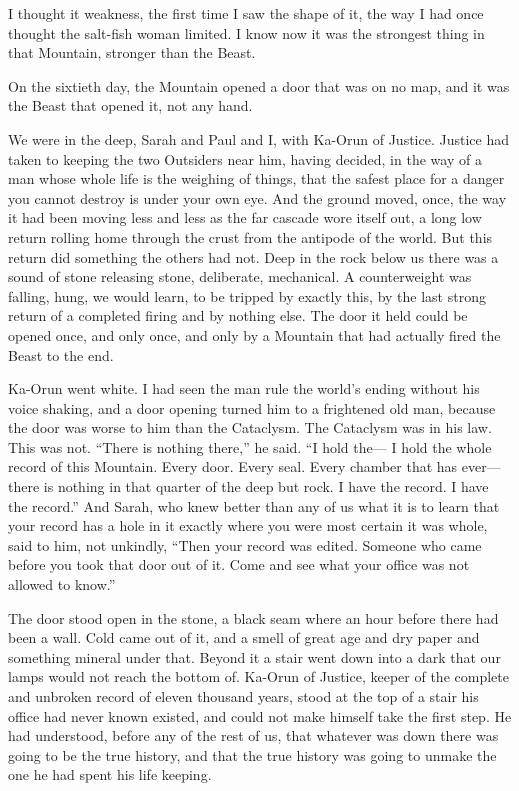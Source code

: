 I thought it weakness, the first time I saw the shape of it, the way I had once thought the salt-fish woman limited. I know now it was the strongest thing in that Mountain, stronger than the Beast.\par

\ornament

On the sixtieth day, the Mountain opened a door that was on no map, and it was the Beast that opened it, not any hand.\par

We were in the deep, Sarah and Paul and I, with Ka-Orun of Justice. Justice had taken to keeping the two Outsiders near him, having decided, in the way of a man whose whole life is the weighing of things, that the safest place for a danger you cannot destroy is under your own eye. And the ground moved, once, the way it had been moving less and less as the far cascade wore itself out, a long low return rolling home through the crust from the antipode of the world. But this return did something the others had not. Deep in the rock below us there was a sound of stone releasing stone, deliberate, mechanical. A counterweight was falling, hung, we would learn, to be tripped by exactly this, by the last strong return of a completed firing and by nothing else. The door it held could be opened once, and only once, and only by a Mountain that had actually fired the Beast to the end.\par

Ka-Orun went white. I had seen the man rule the world's ending without his voice shaking, and a door opening turned him to a frightened old man, because the door was worse to him than the Cataclysm. The Cataclysm was in his law. This was not. ``There is nothing there,'' he said. ``I hold the--- I hold the whole record of this Mountain. Every door. Every seal. Every chamber that has ever--- there is nothing in that quarter of the deep but rock. I have the record. I have the record.'' And Sarah, who knew better than any of us what it is to learn that your record has a hole in it exactly where you were most certain it was whole, said to him, not unkindly, ``Then your record was edited. Someone who came before you took that door out of it. Come and see what your office was not allowed to know.''\par

The door stood open in the stone, a black seam where an hour before there had been a wall. Cold came out of it, and a smell of great age and dry paper and something mineral under that. Beyond it a stair went down into a dark that our lamps would not reach the bottom of. Ka-Orun of Justice, keeper of the complete and unbroken record of eleven thousand years, stood at the top of a stair his office had never known existed, and could not make himself take the first step. He had understood, before any of the rest of us, that whatever was down there was going to be the true history, and that the true history was going to unmake the one he had spent his life keeping.\par

